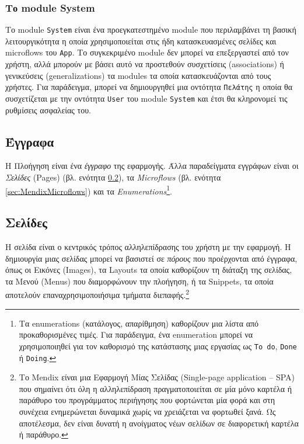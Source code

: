             \subsubsection{Το module System}
                Το module \texttt{System} είναι ένα προεγκατεστημένο module που περιλαμβάνει τη βασική λειτουργικότητα η οποία χρησιμοποιείται στις ήδη κατασκευασμένες σελίδες και microflows του \texttt{App}. Το συγκεκριμένο module δεν μπορεί να επεξεργαστεί από τον χρήστη, αλλά μπορούν με βάσει αυτό να προστεθούν συσχετίσεις (associations) ή γενικεύσεις (generalizations) τα modules τα οποία κατασκευάζονται από τους χρήστες. Για παράδειγμα, μπορεί να δημιουργηθεί μια οντότητα \texttt{Πελάτης} η οποία θα συσχετίζεται με την οντότητα \texttt{User} του module \texttt{System} και έτσι θα κληρονομεί τις ρυθμίσεις ασφαλείας του. \cite{mendixSystemModule}

        \subsection{Έγγραφα}
            Η Πλοήγηση είναι ένα \textit{έγγραφο} της εφαρμογής. Άλλα παραδείγματα εγγράφων είναι οι \textit{Σελίδες} (Pages) (βλ. ενότητα \ref{sec:MendixPages}), τα \textit{Microflows} (βλ. ενότητα \ref{sec:MendixMicroflows}) και τα \textit{Enumerations}\footnote{Τα enumerations (κατάλογος, απαρίθμηση) καθορίζουν μια λίστα από προκαθορισμένες τιμές. Για παράδειγμα, ένα enumeration μπορεί να χρησιμοποιηθεί για τον καθορισμό της κατάστασης μιας εργασίας ως \texttt{To do}, \texttt{Done} ή \texttt{Doing}.}.

        \subsection{Σελίδες} \label{sec:MendixPages}
            Η σελίδα είναι ο κεντρικός τρόπος αλληλεπίδρασης του χρήστη με την εφαρμογή. Η δημιουργία μιας σελίδας μπορεί να βασιστεί σε \textit{πόρους} που προέρχονται από έγγραφα, όπως οι Εικόνες (Images), τα Layouts τα οποία καθορίζουν τη διάταξη της σελίδας, τα Μενού (Menus) που διαμορφώνουν την πλοήγηση, ή τα Snippets, τα οποία αποτελούν επαναχρησιμοποιήσιμα τμήματα διεπαφής.\footnote{Το Mendix είναι μια Εφαρμογή Μίας Σελίδας (Single-page application -- SPA) που σημαίνει ότι όλη η αλληλεπίδραση πραγματοποιείται σε μία μόνο καρτέλα ή παράθυρο του προγράμματος περιήγησης που φορτώνεται μία φορά και στη συνέχεια ενημερώνεται δυναμικά χωρίς να χρειάζεται να φορτωθεί ξανά. Ως αποτέλεσμα, δεν είναι δυνατή η ανοίγματος νέων σελίδων σε διαφορετική καρτέλα ή παράθυρο.}

